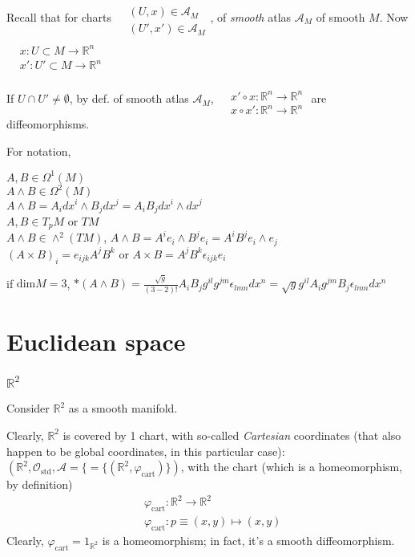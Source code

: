 \documentclass[10pt, twoside]{amsart}
\begin{document}
\begin{multicols*}{2}
Recall that for charts $\begin{aligned} & \quad \\
  & (U,x) \in \mathcal{A}_M \\
  & (U',x') \in \mathcal{A}_M \end{aligned}$, of \emph{smooth} atlas $\mathcal{A}_M$ of smooth $M$.  Now $\begin{aligned} & \quad \\
  & x : U \subset M \to \mathbb{R}^n \\
  & x':U' \subset M \to \mathbb{R}^n \end{aligned}$ 

If $U \cap U'\neq \emptyset$, by def. of smooth atlas $\mathcal{A}_M$, $\begin{aligned} & \quad \\
  & x'\circ x : \mathbb{R}^n \to \mathbb{R}^n \\
  & x\circ x' : \mathbb{R}^n \to \mathbb{R}^n \end{aligned}$ are diffeomorphisms.

For notation, 


$A,B \in \Omega^1(M)$ \\
$A \wedge B \in \Omega^2(M)$ \\
$A\wedge B = A_i dx^i \wedge B_j dx^j =A_iB_j dx^i \wedge dx^j$  \\
$A,B \in T_pM$ or $TM$ \\
$A \wedge B \in \wedge^2(TM)$, $A\wedge B = A^i e_i \wedge B^j e_i = A^i B^j e_i \wedge e_j$ \\
$(A\times B)_i = e_{ijk} A^j B^k$ or $A\times B = A^j B^k \epsilon_{ijk} e_i$

if $\text{dim}M = 3$, $*(A\wedge B) = \frac{\sqrt{g}}{(3-2)!} A_i B_j g^{il} g^{jm} \epsilon_{lmn} dx^n = \sqrt{g} g^{il} A_i g^{jm} B_j \epsilon_{lmn}dx^n$




\part{Euclidean space}

\section{$\mathbb{R}^2$}

Consider $\mathbb{R}^2$ as a smooth manifold.  

Clearly, $\mathbb{R}^2$ is covered by 1 chart, with so-called \emph{Cartesian} coordinates (that also happen to be global coordinates, in this particular case): $(\mathbb{R}^2, \mathcal{O}_{\text{std}}, \mathcal{A} = \lbrace = \lbrace (\mathbb{R}^2, \varphi_{\text{cart}} ) \rbrace )$, with the chart (which is a homeomorphism, by definition)
\[
\begin{aligned}
  & \varphi_{\text{cart}} : \mathbb{R}^2 \to \mathbb{R}^2 \\ 
  & \varphi_{\text{cart}} : p \equiv (x,y) \mapsto (x,y)
\end{aligned}
\]
Clearly, $\varphi_{\text{cart}} = 1_{\mathbb{R}^2}$ is a homeomorphism; in fact, it's a smooth diffeomorphism.  


\end{multicols*}
\end{document}
